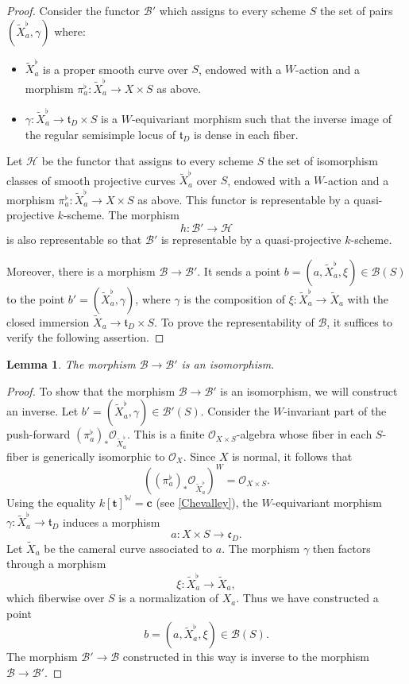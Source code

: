 \documentclass[12pt,english]{smfart}
\numberwithin{equation}{subsection}
\newtheorem{lemma}[equation]{Lemma}
\theoremstyle{remark}
\begin{document}
\begin{proof}
Consider the functor $\mathcal{B}'$ which assigns to every scheme $S$ the set of pairs $(\widetilde X_a^\flat, \gamma)$ where:
\begin{itemize}
  \item $\widetilde X_a^\flat$ is a proper smooth curve over $S$, endowed with a $W$-action and a morphism $\pi_a^\flat:\widetilde X_a^\flat\rightarrow X\times S$ as above.
  \item $\gamma:\widetilde X_a^\flat \rightarrow \mathfrak{t}_D \times S$ is a $W$-equivariant morphism such that the inverse image of the regular semisimple locus of $\mathfrak{t}_D$ is dense in each fiber.
\end{itemize}
Let $\mathcal{H}$ be the functor that assigns to every scheme $S$ the set of isomorphism classes of smooth projective curves $\widetilde X_a^\flat$ over $S$, endowed with a $W$-action and a morphism $\pi_a^\flat:\widetilde X_a^\flat\rightarrow X\times S$ as above. This functor is representable by a quasi-projective $k$-scheme. The morphism 
$$h:\mathcal{B}'\rightarrow \mathcal{H}$$ 
is also representable so that $\mathcal{B}'$ is representable by a quasi-projective $k$-scheme.

Moreover, there is a morphism $\mathcal{B}\rightarrow \mathcal{B}'$. It sends a point $b=(a,\widetilde X_a^\flat,\xi)\in\mathcal{B}(S)$ to the point $b'=(\widetilde X_a^\flat, \gamma)$, where $\gamma$ is the composition of $\xi:\widetilde X_a^\flat\rightarrow \widetilde X_a$ with the closed immersion $\widetilde X_a\rightarrow \mathfrak{t}_D\times S$. To prove the representability of $\mathcal{B}$, it suffices to verify the following assertion.
\end{proof}

\begin{lemma}
The morphism $\mathcal{B}\rightarrow \mathcal{B}'$ is an isomorphism.
\end{lemma}

\begin{proof}
To show that the morphism $\mathcal{B}\rightarrow \mathcal{B}'$ is an isomorphism, we will construct an inverse. Let $b'=(\widetilde X_a^\flat, \gamma)\in\mathcal{B}'(S)$. Consider the $W$-invariant part of the push-forward $(\pi_a^\flat)_*\mathcal{O}_{\widetilde X_a^\flat}$. This is a finite $\mathcal{O}_{X\times S}$-algebra whose fiber in each $S$-fiber is generically isomorphic to $\mathcal{O}_X$. Since $X$ is normal, it follows that
$$((\pi_a^\flat)_*\mathcal{O}_{\widetilde X_a^\flat})^{W}=\mathcal{O}_{X\times S}.$$
Using the equality $k[\mathbf{t}]^{\mathbb{W}}=\mathbf{c}$ (see \ref{Chevalley}), the $W$-equivariant morphism $\gamma:\widetilde X_a^\flat\rightarrow \mathfrak{t}_D$ induces a morphism 
$$a:X\times S\rightarrow \mathfrak{c}_D.$$ 
Let $\widetilde X_a$ be the cameral curve associated to $a$. The morphism $\gamma$ then factors through a morphism 
$$\xi:\widetilde X_a^\flat\rightarrow \widetilde X_a,$$
which fiberwise over $S$ is a normalization of $X_a$. Thus we have constructed a point 
$$b=(a,\widetilde X_a^\flat,\xi)\in \mathcal{B}(S).$$ 
The morphism $\mathcal{B}'\rightarrow\mathcal{B}$ constructed in this way is inverse to the morphism $\mathcal{B}\rightarrow \mathcal{B}'$.
\end{proof}
\end{document}
